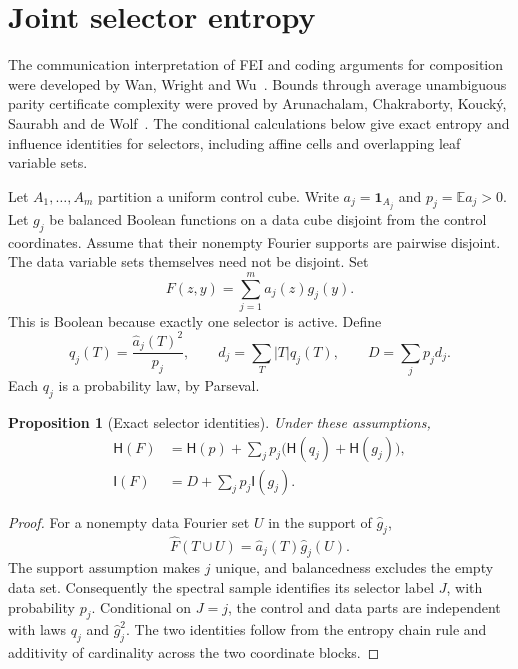 \documentclass[11pt]{amsart}
\newtheorem{proposition}[theorem]{Proposition}
\theoremstyle{definition}
\theoremstyle{remark}
\newcommand{\HH}{\mathsf H}
\newcommand{\I}{\mathsf I}
\begin{document}
\section{Joint selector entropy}\label{sec:selectors}

The communication interpretation of FEI and coding arguments for
composition were developed by Wan, Wright and Wu~\cite{WWW14}.
Bounds through average unambiguous parity certificate complexity
were proved by Arunachalam, Chakraborty, Kouck\'y, Saurabh and
de Wolf~\cite{ACKSW21}. The conditional calculations below give exact
entropy and influence identities for selectors, including affine cells
and overlapping leaf variable sets.

Let $A_1,\ldots,A_m$ partition a uniform control cube. Write
$a_j=\mathbf 1_{A_j}$ and $p_j=\mathbb E a_j>0$.
Let $g_j$ be balanced Boolean functions on a data cube disjoint from the
control coordinates. Assume that their nonempty Fourier supports are
pairwise disjoint. The data variable sets themselves need not be disjoint.
Set
\[
 F(z,y)=\sum_{j=1}^m a_j(z)g_j(y).
\]
This is Boolean because exactly one selector is active.
Define
\[
 q_j(T)=\frac{\widehat a_j(T)^2}{p_j},\qquad
 d_j=\sum_T |T|q_j(T),\qquad D=\sum_jp_jd_j.
\]
Each $q_j$ is a probability law, by Parseval.

\begin{proposition}[Exact selector identities]\label{prop:selector-identities}
Under these assumptions,
\begin{align*}
 \HH(F)&=\HH(p)+\sum_jp_j\bigl(\HH(q_j)+\HH(g_j)\bigr),\\
 \I(F)&=D+\sum_jp_j \I(g_j).
\end{align*}
\end{proposition}
\begin{proof}
For a nonempty data Fourier set $U$ in the support of $\widehat g_j$,
\[
 \widehat F(T\cup U)=\widehat a_j(T)\widehat g_j(U).
\]
The support assumption makes $j$ unique, and balancedness excludes the
empty data set. Consequently the spectral sample identifies its selector
label $J$, with probability $p_j$. Conditional on $J=j$, the control and
data parts are independent with laws $q_j$ and $\widehat g_j^2$.
The two identities follow from the entropy chain rule and additivity of
cardinality across the two coordinate blocks.
\end{proof}
\end{document}
